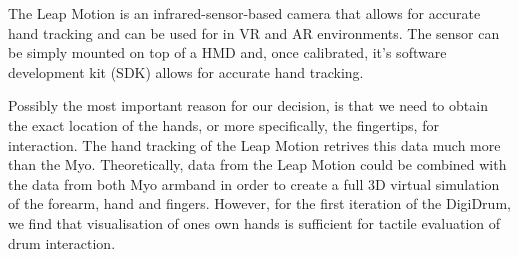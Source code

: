 \documentclass{article}
\begin{document}


The Leap Motion \cite{leapwebsite} is an infrared-sensor-based camera that allows for accurate hand tracking and can be used for in VR and AR environments. The sensor can be simply mounted on top of a HMD and, once calibrated, it's software development kit (SDK) allows for accurate hand tracking.

Possibly the most important reason for our decision, is that we need to obtain the exact location of the hands, or more specifically, the fingertips, for interaction. The hand tracking of the Leap Motion retrives this data much more than the Myo. Theoretically, data from the Leap Motion could be combined with the data from both Myo armband in order to create a full 3D virtual simulation of the forearm, hand and fingers. However, for the first iteration of the DigiDrum, we find that visualisation of ones own hands is sufficient for tactile evaluation of drum interaction.
\end{document}

